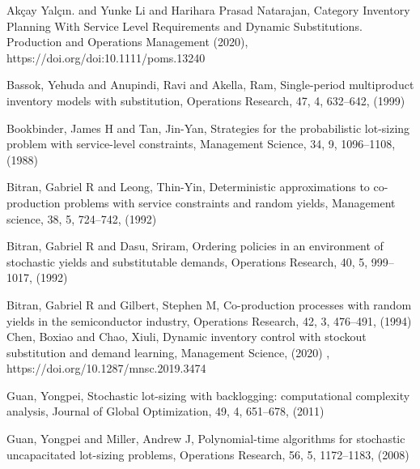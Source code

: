 \documentclass[10pt]{article}
\begin{document}
    



\begin{thebibliography}{99}






Akçay Yalçın. and Yunke Li and Harihara Prasad Natarajan, Category Inventory Planning With
Service Level Requirements and Dynamic Substitutions.
Production and Operations Management (2020), https://doi.org/doi:10.1111/poms.13240

Bassok, Yehuda and Anupindi, Ravi and Akella, Ram,
Single-period multiproduct inventory models with substitution, Operations Research, 47, 4, 632--642, (1999)
 

 Bookbinder, James H and Tan, Jin-Yan, Strategies for the probabilistic lot-sizing problem with service-level constraints, Management Science, 34, 9, 1096--1108,
 (1988)


Bitran, Gabriel R and Leong, Thin-Yin, Deterministic approximations to co-production problems with service constraints and random yields, Management science, 38, 5, 724--742, (1992)
  
  
Bitran, Gabriel R and Dasu, Sriram, Ordering policies in an environment of stochastic yields and substitutable demands,
Operations Research,
40, 5,
999--1017, (1992)

Bitran, Gabriel R and Gilbert, Stephen M,
  Co-production processes with random yields in the semiconductor industry, Operations Research, 42, 3, 476--491, (1994)
Chen, Boxiao and Chao, Xiuli, Dynamic inventory control with stockout substitution and demand learning, Management Science, (2020) , https://doi.org/10.1287/mnsc.2019.3474


 Guan, Yongpei, Stochastic lot-sizing with backlogging: computational complexity analysis,  Journal of Global Optimization, 49, 4, 651--678, (2011)

  Guan, Yongpei and Miller, Andrew J, Polynomial-time algorithms for stochastic uncapacitated lot-sizing problems,  Operations Research, 56, 5, 1172--1183,
(2008)



\end{thebibliography}
\end{document}
